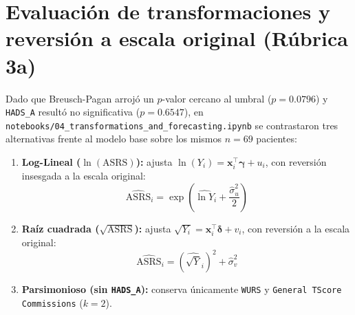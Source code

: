 \documentclass[11pt,letterpaper]{article}
\begin{document}
\section{Evaluación de transformaciones y reversión a escala original (Rúbrica 3a)}

Dado que Breusch-Pagan arrojó un $p$-valor cercano al umbral ($p = 0.0796$) y \texttt{HADS\_A} resultó no significativa ($p = 0.6547$), en \texttt{notebooks/04\_transformations\_and\_forecasting.ipynb} se contrastaron tres alternativas frente al modelo base sobre los mismos $n = 69$ pacientes:

\begin{enumerate}
  \item \textbf{Log-Lineal ($\ln(\text{ASRS})$):} ajusta $\ln(Y_i) = \mathbf{x}_i^\top \boldsymbol{\gamma} + u_i$, con reversión insesgada a la escala original:
  \[
    \widehat{\text{ASRS}}_i = \exp\!\left(\widehat{\ln Y}_i + \frac{\hat{\sigma}_u^2}{2}\right)
  \]
  \item \textbf{Raíz cuadrada ($\sqrt{\text{ASRS}}$):} ajusta $\sqrt{Y_i} = \mathbf{x}_i^\top \boldsymbol{\delta} + v_i$, con reversión a la escala original:
  \[
    \widehat{\text{ASRS}}_i = \left(\widehat{\sqrt{Y}}_i\right)^2 + \hat{\sigma}_v^2
  \]
  \item \textbf{Parsimonioso (sin \texttt{HADS\_A}):} conserva únicamente \texttt{WURS} y \texttt{General TScore Commissions} ($k = 2$).
\end{enumerate}

\begin{table}[H]
  \centering
  \caption{Comparación de modelos candidatos en escala original de \texttt{ASRS} y supuestos ($n = 69$).}
  \label{tab:transf}
\end{table}
\end{document}
